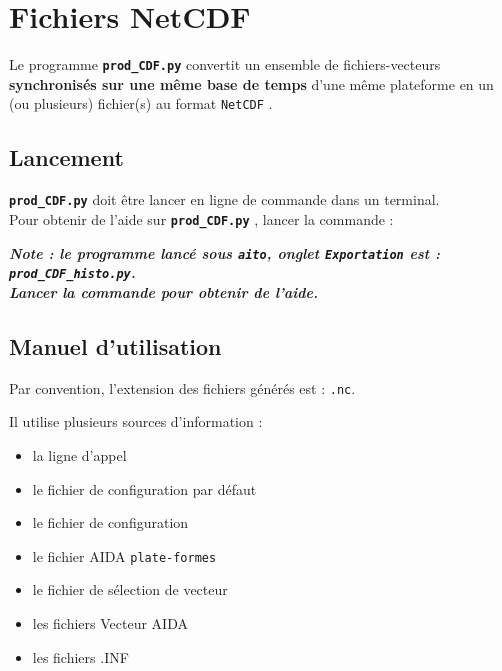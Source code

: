 \section{Fichiers NetCDF}

\newcommand{\prodcdf}{\textbf{\texttt{prod\_CDF.py}} }
\newcommand{\netcdf}{\texttt{NetCDF} }
\newcommand\myfontsize{\fontsize{9pt}{10pt}\selectfont}

Le programme \prodcdf convertit un ensemble de
fichiers-vecteurs \textbf{synchronisés sur une même base de temps} d'une même
plateforme en un (ou plusieurs) fichier(s) au format \netcdf.\\

\subsection{Lancement}
\prodcdf doit être lancer en ligne de commande dans un terminal. \\
Pour obtenir de l'aide sur \prodcdf, lancer la commande :

\medbreak
\textbf{\textit{Note : le programme lancé sous \texttt{aito}, onglet
\texttt{Exportation} est : \texttt{prod\_CDF\_histo.py}. \\
Lancer la commande  pour obtenir de
l'aide.}
}


\subsection{Manuel d'utilisation}
Par convention, l'extension des fichiers générés est : \texttt{.nc}.

\medbreak
Il utilise plusieurs sources d'information :
\begin{itemize}
\item
  la ligne d'appel
\item
  le fichier de configuration par défaut
\item
  le fichier de configuration
\item
  le fichier AIDA \texttt{plate-formes}
\item
  le fichier de sélection de vecteur
\item
  les fichiers Vecteur AIDA
\item
  les fichiers .INF
\end{itemize}


